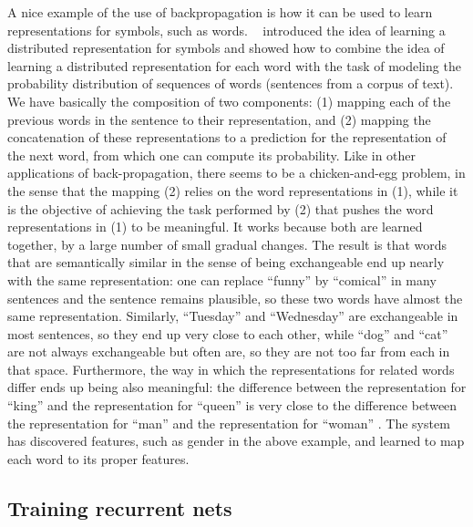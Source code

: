 \documentclass[11pt]{article} %
\begin{document}
A nice example of the use of backpropagation is how it can be used to learn
representations for symbols, such as words. ~\citet{Hinton86b} introduced the idea
of learning a distributed representation for symbols and \citet{BenDucVin01-short}
showed how to combine the idea of learning a distributed
representation for each word with the task of modeling the probability
distribution of sequences of words (sentences from a corpus of text). We
have basically the composition of two components: (1) mapping each of the
previous words in the sentence to their representation, and (2) mapping the
concatenation of these representations to a prediction for the
representation of the next word, from which one can compute its
probability.  Like in other applications of back-propagation, there seems
to be a chicken-and-egg problem, in the sense that the mapping (2) relies
on the word representations in (1), while it is the objective of achieving
the task performed by (2) that pushes the word representations in (1) to be
meaningful. It works because both are learned together, by a large number
of small gradual changes. The result is that words that are semantically
similar in the sense of being exchangeable end up nearly with the same
representation: one can replace ``funny'' by ``comical'' in many sentences and
the sentence remains plausible, so these two words have almost the same
representation. Similarly, ``Tuesday'' and ``Wednesday'' are exchangeable in
most sentences, so they end up very close to each other, while ``dog'' and
``cat'' are not always exchangeable but often are, so they are not too far
from each in that space. Furthermore, the way in which the representations
for related words differ ends up being also meaningful: the difference
between the representation for ``king'' and the representation for ``queen'' is
very close to the difference between the representation for ``man'' and the
representation for ``woman'' \citep{Mikolov-et-al-ICLR2013}. The system has discovered
features, such as gender in the above example, and learned to map each word
to its proper features.


\iffalse
\begin{figure}[H]
\centerline{\texttt{[image: fig-hidden-recurrence-rnn.png]}}
\caption{(a better figure can be made)}
\end{figure}
\fi

\subsection{Training recurrent nets}
\end{document}

